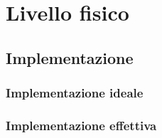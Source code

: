 \chapter{Livello fisico}
    \section{Implementazione}
    \subsection{Implementazione ideale}
    \subsection{Implementazione effettiva}
